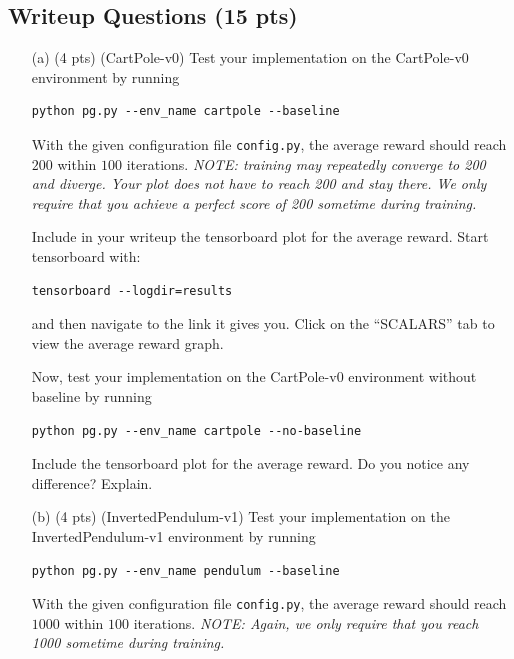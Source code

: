 \documentclass{article}
\begin{document}
\subsection{Writeup Questions (15 pts)}
\begin{enumerate}
\item[(a) (4 pts)] (CartPole-v0)
Test your implementation on the CartPole-v0 environment by running
\begin{tcolorbox}
\begin{verbatim}
python pg.py --env_name cartpole --baseline
\end{verbatim}
\end{tcolorbox}
With the given configuration file \texttt{config.py}, the average reward should reach $200$ within $100$ iterations. \emph{NOTE: training may repeatedly converge to 200 and diverge. Your plot does not have to reach 200 and stay there. We only require that you achieve a perfect score of 200 sometime during training.} 

Include in your writeup the tensorboard plot for the average reward. Start tensorboard with:
\begin{tcolorbox}
\begin{verbatim}
tensorboard --logdir=results
\end{verbatim}
\end{tcolorbox}
and then navigate to the link it gives you. Click on the ``SCALARS'' tab to view the average reward graph.

Now, test your implementation on the CartPole-v0 environment without baseline by running
\begin{tcolorbox}
\begin{verbatim}
python pg.py --env_name cartpole --no-baseline
\end{verbatim}
\end{tcolorbox}
Include the tensorboard plot for the average reward. Do you notice any difference? Explain.

\item[(b) (4 pts)](InvertedPendulum-v1)
Test your implementation on the InvertedPendulum-v1 environment by running
\begin{tcolorbox}
\begin{verbatim}
python pg.py --env_name pendulum --baseline
\end{verbatim}
\end{tcolorbox}

With the given configuration file \texttt{config.py}, the average reward should reach $1000$ within $100$ iterations. \emph{NOTE: Again, we only require that you reach 1000 sometime during training.} 


\end{enumerate}
\end{document}
